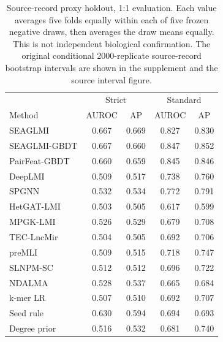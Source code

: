 \begin{table}[t]
\centering
\caption{Source-record proxy holdout, 1:1 evaluation. Each value averages five folds equally within each of five frozen negative draws, then averages the draw means equally. This is not independent biological confirmation. The original conditional 2000-replicate source-record bootstrap intervals are shown in the supplement and the source interval figure.}
\label{tab:source-results}
\small
\setlength{\tabcolsep}{8pt}
\begin{tabular}{lcccc}
\toprule
 & \multicolumn{2}{c}{Strict} & \multicolumn{2}{c}{Standard} \\
Method & AUROC & AP & AUROC & AP \\
\midrule
SEAGLMI & 0.667 & 0.669 & 0.827 & 0.830 \\
SEAGLMI-GBDT & 0.667 & 0.660 & 0.847 & 0.852 \\
PairFeat-GBDT & 0.660 & 0.659 & 0.845 & 0.846 \\
DeepLMI & 0.509 & 0.517 & 0.738 & 0.760 \\
SPGNN & 0.532 & 0.534 & 0.772 & 0.791 \\
HetGAT-LMI & 0.503 & 0.505 & 0.617 & 0.599 \\
MPGK-LMI & 0.526 & 0.529 & 0.679 & 0.708 \\
TEC-LncMir & 0.504 & 0.505 & 0.692 & 0.706 \\
preMLI & 0.509 & 0.515 & 0.718 & 0.747 \\
SLNPM-SC & 0.512 & 0.512 & 0.696 & 0.722 \\
NDALMA & 0.528 & 0.537 & 0.665 & 0.684 \\
k-mer LR & 0.507 & 0.510 & 0.692 & 0.707 \\
Seed rule & 0.630 & 0.594 & 0.694 & 0.693 \\
Degree prior & 0.516 & 0.532 & 0.681 & 0.740 \\
\bottomrule
\end{tabular}
\end{table}
